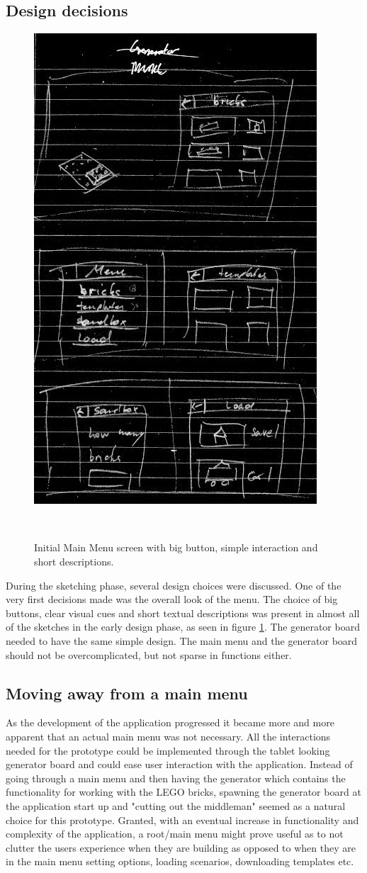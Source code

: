 \subsection{Design decisions}
\begin{figure}[h]
	\centering
	\includegraphics[width=0.5\columnwidth]{figures/Menu/menu1.png}
	\caption{Initial Main Menu screen with big button, simple interaction and short descriptions.}~\label{fig:genboard}
\end{figure}
During the sketching phase, several design choices were discussed. One of the very first decisions made was the overall look of the menu. The choice of big buttons, clear visual cues and short textual descriptions was present in almost all of the sketches in the early design phase, as seen in figure \ref{fig:genboard}. The generator board needed to have the same simple design. The main menu and the generator board should not be overcomplicated, but not sparse in functions either. 
\subsection{Moving away from a main menu}
As the development of the application progressed it became more and more apparent that an actual main menu was not necessary. All the interactions needed for the prototype could be implemented through the tablet looking generator board and could ease user interaction with the application. Instead of going through a main menu and then having the generator which contains the functionality for working with the LEGO bricks, spawning the generator board at the application start up and "cutting out the middleman" seemed as a natural choice for this prototype. Granted, with an eventual increase in functionality and complexity of the application, a root/main menu might prove useful as to not clutter the users experience when they are building as opposed to when they are in the main menu setting options, loading scenarios, downloading templates etc.